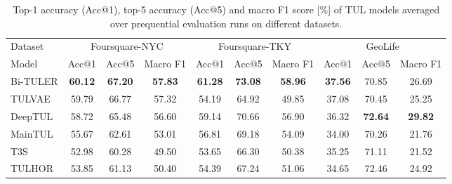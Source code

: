 \documentclass{article} %
\theoremstyle{definition}
\begin{document}
\begin{table}[h]
    \caption{Top-1 accuracy (Acc@1), top-5 accuracy (Acc@5) and macro F1 score [\%] of TUL models averaged over prequential evaluation runs on different datasets.}
    \label{tab:models}
    \begin{tabular}{lccccccccc}
        \toprule
        Dataset  & \multicolumn{3}{c}{Foursquare-NYC} & \multicolumn{3}{c}{Foursquare-TKY} & \multicolumn{3}{c}{GeoLife}                                                                                                             \\
        \cmidrule(lr){2-4} \cmidrule(lr){5-7} \cmidrule(lr){8-10}
        Model    & Acc@1                              & Acc@5                              & Macro F1                    & Acc@1           & Acc@5           & Macro F1        & Acc@1           & Acc@5           & Macro F1        \\
        \midrule
        Bi-TULER & \bfseries 60.12                    & \bfseries 67.20                    & \bfseries 57.83             & \bfseries 61.28 & \bfseries 73.08 & \bfseries 58.96 & \bfseries 37.56 & 70.85           & 26.69           \\
        TULVAE   & 59.79                              & 66.77                              & 57.32                       & 54.19           & 64.92           & 49.85           & 37.08           & 70.45           & 25.25           \\
        DeepTUL  & 58.72                              & 65.48                              & 56.60                       & 59.14           & 70.66           & 56.90           & 36.32           & \bfseries 72.64 & \bfseries 29.82 \\
        MainTUL  & 55.67                              & 62.61                              & 53.01                       & 56.81           & 69.18           & 54.09           & 34.00           & 70.26           & 21.76           \\
        T3S      & 52.98                              & 60.28                              & 49.50                       & 53.65           & 66.30           & 50.38           & 35.25           & 71.11           & 21.52           \\
        TULHOR   & 53.85                              & 61.13                              & 50.40                       & 54.39           & 67.24           & 51.06           & 34.65           & 72.46           & 24.92           \\
        \bottomrule
    \end{tabular}
\end{table}
\end{document}
